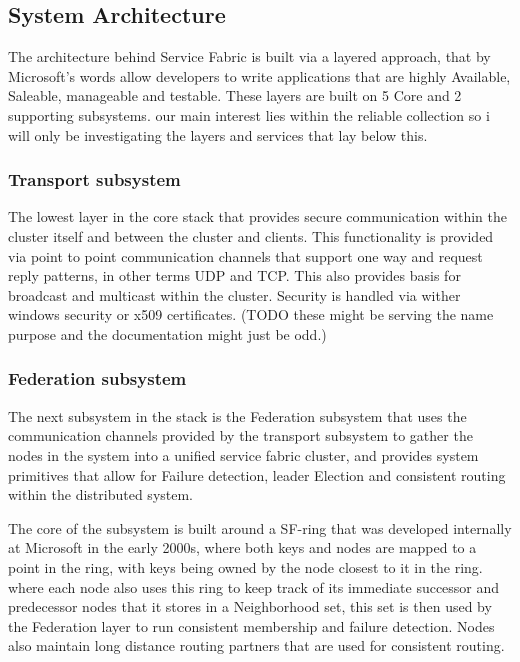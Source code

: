 \documentclass[a4paper,10pt,titlepage]{report}
\begin{document}
\subsection{System Architecture}

The architecture behind Service Fabric is built via a layered approach, that by Microsoft's words allow developers to write applications that are highly Available, Saleable, manageable and testable. These layers are built on 5 Core and 2 supporting subsystems.  our main interest lies within the reliable collection so i will only be investigating the layers and services that lay below this.\\
\vspace{5mm}



\subsubsection{Transport subsystem}

The lowest layer in the core stack that provides secure communication within the cluster itself and between the cluster and clients. This functionality is provided via point to point communication channels that support one way and request reply patterns, in other terms UDP and TCP. This also provides basis for broadcast and multicast within the cluster. Security is handled via wither windows security or x509 certificates. (TODO these might be serving the name purpose and the documentation might just be odd.)\\
\vspace{5mm}

\subsubsection{Federation subsystem}

The next subsystem in the stack is the Federation subsystem that uses the communication channels provided by the transport subsystem to gather the nodes in the system into a unified service fabric cluster, and provides system primitives that allow for Failure detection, leader Election and consistent routing within the distributed system.\\
\vspace{5mm}

The core of the subsystem is built around a SF-ring that was developed internally at Microsoft in the early 2000s, where both keys and nodes are mapped to a point in the ring, with keys being owned by the node closest to it in the ring. where each node also uses this ring to keep track of its immediate successor and predecessor nodes that it stores in a Neighborhood set, this set is then used by the Federation layer to run consistent membership and failure detection. Nodes also maintain long distance routing partners that are used for consistent routing.\\
\vspace{5mm}
\end{document}
